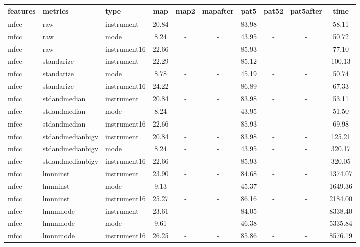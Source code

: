   
\begin{table} 
\begin{center} 
\ 
 \setlength{\tabcolsep}{.16667em} 
\begin{tabular}{lllccccccc} 
features & metrics & type & map & map2 & mapafter & pat5 & pat52 & pat5after & time \\ 
\hline 
mfcc & raw & instrument & 20.84 &   - &   - & 83.98 &   - &   - &     58.11 \\ 
mfcc & raw & mode &  8.24 &   - &   - & 43.95 &   - &   - &     50.72 \\ 
mfcc & raw & instrument16 & 22.66 &   - &   - & 85.93 &   - &   - &     77.10 \\ 
mfcc & standarize & instrument & 22.29 &   - &   - & 85.12 &   - &   - &    100.13 \\ 
mfcc & standarize & mode &  8.78 &   - &   - & 45.19 &   - &   - &     50.74 \\ 
mfcc & standarize & instrument16 & 24.22 &   - &   - & 86.89 &   - &   - &     67.33 \\ 
mfcc & stdandmedian & instrument & 20.84 &   - &   - & 83.98 &   - &   - &     53.11 \\ 
mfcc & stdandmedian & mode &  8.24 &   - &   - & 43.95 &   - &   - &     51.50 \\ 
mfcc & stdandmedian & instrument16 & 22.66 &   - &   - & 85.93 &   - &   - &     69.98 \\ 
mfcc & stdandmedianbigv & instrument & 20.84 &   - &   - & 83.98 &   - &   - &    125.21 \\ 
mfcc & stdandmedianbigv & mode &  8.24 &   - &   - & 43.95 &   - &   - &    320.17 \\ 
mfcc & stdandmedianbigv & instrument16 & 22.66 &   - &   - & 85.93 &   - &   - &    320.05 \\ 
mfcc & lmnninst & instrument & 23.90 &   - &   - & 84.68 &   - &   - &   1374.07 \\ 
mfcc & lmnninst & mode &  9.13 &   - &   - & 45.37 &   - &   - &   1649.36 \\ 
mfcc & lmnninst & instrument16 & 25.27 &   - &   - & 86.16 &   - &   - &   2184.00 \\ 
mfcc & lmnnmode & instrument & 23.61 &   - &   - & 84.05 &   - &   - &   8338.40 \\ 
mfcc & lmnnmode & mode &  9.61 &   - &   - & 46.38 &   - &   - &   5335.84 \\ 
mfcc & lmnnmode & instrument16 & 26.25 &   - &   - & 85.86 &   - &   - &   8576.19 \\ 

\end{tabular}
\end{center}
\end{table}
